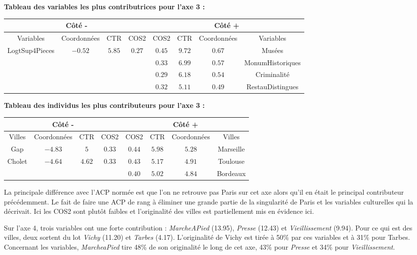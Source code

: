 \documentclass{article}
\begin{document}
\textbf{Tableau des variables les plus contributrices pour l'axe 3 :}
\begin{center}
\begin{tabular}{|c|c|c|c||c|c|c|c|}
\multicolumn{4}{c}{Côté -} & \multicolumn{4}{c}{Côté +}\\
\hline 
Variables & Coordonnées & CTR & COS2 & COS2 & CTR & Coordonnées & Variables \\ 
\hline 
LogtSup4Pieces & $-0.52$ & $5.85$ & $0.27$  & $0.45$  & $9.72$ & $0.67$ & Musées  \\ 
\hline 
&  &  &  & $0.33$ & $6.99$ &  $0.57$ &  MonumHistoriques\\ 
\hline 
&  &  &  & $0.29$ & $6.18$ & $0.54$ & Criminalité \\ 
\hline 
&  &  &  & $0.32$ & $5.11$ & $0.49$ & RestauDistingues \\ 
\hline
\end{tabular} 
\end{center}

\bigskip

\textbf{Tableau des individus les plus contributeurs pour l'axe 3 :}
\begin{center}
\begin{tabular}{|c|c|c|c||c|c|c|c|}
\multicolumn{4}{c}{Côté -} & \multicolumn{4}{c}{Côté +}\\
\hline 
Villes & Coordonnées & CTR & COS2 & COS2 & CTR & Coordonnées & Villes \\ 
\hline 
Gap & $-4.83$ & $5$ & $0.33$ & $0.44$ & $5.98$ & $5.28$ & Marseille\\
\hline
 Cholet & $-4.64$  & $4.62$  & $0.33$ & $0.43$ & $5.17$ & $4.91$ & Toulouse\\ 
\hline 
 &  &  &  & $0.40$ & $5.02$ & $4.84$ & Bordeaux\\ 
\hline 
\end{tabular} 
\end{center}

La principale différence avec l'ACP normée est que l'on ne retrouve pas Paris sur cet axe alors qu'il en était le principal contributeur précédemment. Le fait de faire une ACP de rang à éliminer une grande partie de la singularité de Paris et les variables culturelles qui la décrivait. Ici les COS2 sont plutôt faibles et l'originalité des villes est partiellement mis en évidence ici.

\bigskip

Sur l'axe 4, trois variables ont une forte contribution : \emph{MarcheAPied} (13.95), \emph{Presse} (12.43) et \emph{Vieillissement} (9.94). Pour ce qui est des villes, deux sortent du lot \emph{Vichy} (11.20) et \emph{Tarbes} (4.17). L'originalité de Vichy est tirée à 50\% par ces variables et à 31\% pour Tarbes. Concernant les variables, \emph{MarcheaPied} tire 48\% de son originalité le long de cet axe, 43\% pour \emph{Presse} et 34\% pour \emph{Vieillissement}. 
\end{document}
